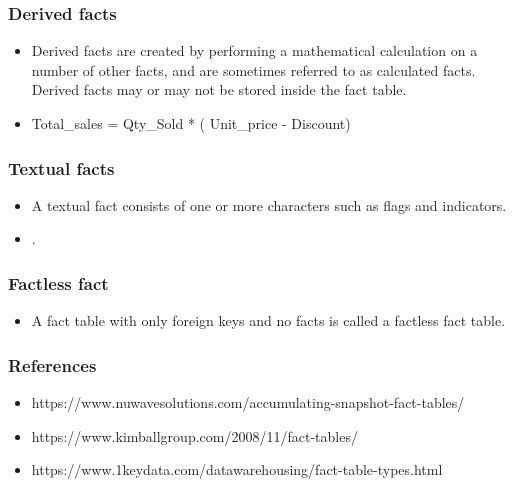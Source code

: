 \begin{frame}
    \frametitle{Derived facts}
    
    \begin{itemize}
        \item Derived facts are created by performing a mathematical calculation
        on a number of other facts, and are sometimes referred to as
        calculated facts. Derived facts may or may not be stored inside the
        fact table.
        \item Total\_sales = Qty\_Sold * ( Unit\_price - Discount)
    \end{itemize}

    \centering
    


\end{frame}
\begin{frame}
    \frametitle{Textual facts}
    \begin{itemize}
        \item A textual fact consists of one or more characters such as flags and indicators.
        \item {}.
    \end{itemize}
    
\end{frame}
\begin{frame}
\frametitle{Factless fact}
    \begin{itemize}
        \item A fact table with only foreign keys and no facts is called a factless
        fact table.
    \end{itemize}
\end{frame}
\begin{frame}
    \frametitle{References}
        \begin{itemize}
            \item https://www.nuwavesolutions.com/accumulating-snapshot-fact-tables/
            \item https://www.kimballgroup.com/2008/11/fact-tables/
            \item https://www.1keydata.com/datawarehousing/fact-table-types.html
        \end{itemize}
\end{frame}
